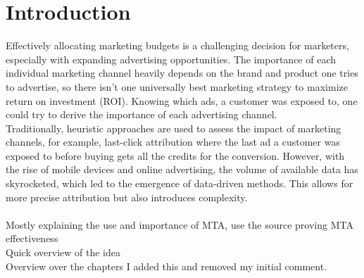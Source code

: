 \chapter{Introduction}
Effectively allocating marketing budgets is a challenging decision for marketers, especially with expanding advertising opportunities. 
The importance of each individual marketing channel heavily depends on the brand and product one tries to advertise, so there isn't one universally best marketing strategy to maximize return on investment (ROI). 
Knowing which ads, a customer was exposed to, one could try to derive the importance of each advertising channel. 
\\ 
Traditionally, heuristic approaches are used to assess the impact of marketing channels, for example, last-click attribution where the last ad a customer was exposed to before buying gets all the credits for the conversion. However, with the rise of mobile devices and online advertising, the volume of available data has skyrocketed, which led to the emergence of data-driven methods. This allows for more precise attribution but also introduces complexity. \\

\\
\color{red}
    Mostly explaining the use and importance of MTA, use the source proving MTA effectiveness \\
    Quick overview of the idea\\
    Overview over the chapters
    I added this and removed my initial comment.
\color{black}

